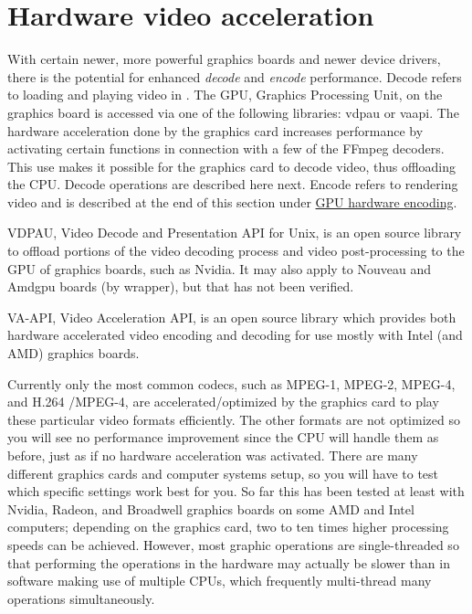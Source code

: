 \section{Hardware video acceleration}%
\label{sec:hardware_video_acceleration}

With certain newer, more powerful graphics boards and newer device drivers, there is the potential for enhanced \textit{decode} and \textit{encode} performance.   Decode refers to loading and playing video in \CGG{}. The GPU, Graphics Processing Unit, on the graphics board is accessed via one of the following libraries: vdpau or vaapi. The hardware acceleration done by the graphics card increases performance by activating certain functions in connection with a few of the FFmpeg decoders. This use makes it possible for the graphics card to decode video, thus offloading the CPU.  Decode operations are described here next.  
Encode refers to rendering video and is described at the end of this section
under \hyperref[sub:gpu_hardware_encoding]{GPU hardware encoding}.

VDPAU, Video Decode and Presentation API for Unix, is an open source library to offload portions of the video decoding process and video post-processing to the GPU of graphics boards, such as Nvidia.  It may also apply to Nouveau and Amdgpu boards (by wrapper), but that has not been verified.

VA-API, Video Acceleration API, is an open source library which provides both hardware accelerated video encoding and decoding for use mostly with Intel (and AMD) graphics boards. 

Currently only the most common codecs, such as MPEG-1, MPEG-2, MPEG-4, and H.264 /MPEG-4, are accelerated/optimized by the graphics card to play these particular video formats efficiently. The other formats are not optimized so you will see no performance improvement since the CPU will handle them as before, just as if no hardware acceleration was activated. There are many different graphics cards and computer systems setup, so you will have to test which specific settings work best for you.  So far this has been tested at least with Nvidia, Radeon, and Broadwell graphics boards on some AMD and Intel computers; depending on the graphics card, two to ten times higher processing speeds can be achieved.  However, most graphic operations are single-threaded so that 
performing the operations in the hardware may actually be slower than in software making use of multiple CPUs, which frequently multi-thread many operations simultaneously.

